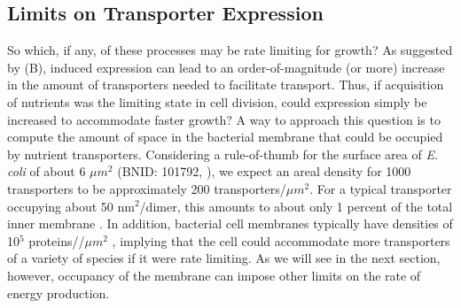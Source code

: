 \subsection{Limits on Transporter Expression}
So which, if any, of these processes may be rate limiting for growth? As
suggested by  (B), induced expression can lead to an
order-of-magnitude (or more) increase in the amount of transporters needed to
facilitate transport. Thus, if acquisition of nutrients was the limiting state
in cell division, could expression simply be increased to accommodate faster
growth? A way to approach this question is to compute the amount of space in the
bacterial membrane that could be occupied by nutrient transporters. Considering a rule-of-thumb for the surface area of
\textit{E. coli} of about 6 $\mu m^2$ (BNID: 101792, \cite{milo2010}), we expect
an areal density for 1000 transporters to be approximately 200
transporters/$\mu m^2$. For a typical transporter occupying about 50
nm$^2$/dimer, this amounts to about only 1 percent of the total inner membrane
\citep{szenk2017}. In addition, bacterial cell membranes typically have
densities of 10$^5$ proteins//$\mu m^2$ \citep{phillips2018}, implying that the
cell could accommodate more transporters of a variety of species if it were rate
limiting. As we will see in the next section, however, occupancy of the membrane can
impose other limits on the rate of energy production. 
